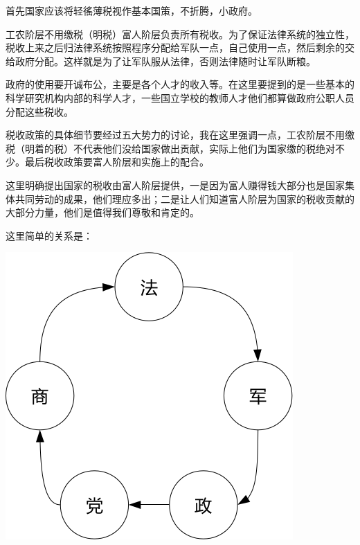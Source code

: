 \documentclass[11pt,oneside]{article}
\begin{document}
\begin{common-format}
首先国家应该将轻徭薄税视作基本国策，不折腾，小政府。

工农阶层不用缴税（明税）富人阶层负责所有税收。为了保证法律系统的独立性，税收上来之后归法律系统按照程序分配给军队一点，自己使用一点，然后剩余的交给政府分配。这样就是为了让军队服从法律，否则法律随时让军队断粮。

政府的使用要开诚布公，主要是各个人才的收入等。在这里要提到的是一些基本的科学研究机构内部的科学人才，一些国立学校的教师人才他们都算做政府公职人员分配这些税收。

税收政策的具体细节要经过五大势力的讨论，我在这里强调一点，工农阶层不用缴税（明着的税）不代表他们没给国家做出贡献，实际上他们为国家缴的税绝对不少。最后税收政策要富人阶层和实施上的配合。

这里明确提出国家的税收由富人阶层提供，一是因为富人赚得钱大部分也是国家集体共同劳动的成果，他们理应多出；二是让人们知道富人阶层为国家的税收贡献的大部分力量，他们是值得我们尊敬和肯定的。

这里简单的关系是：

\includegraphics[scale=1]{figures/五权分立} 




\end{common-format}
\end{document}
